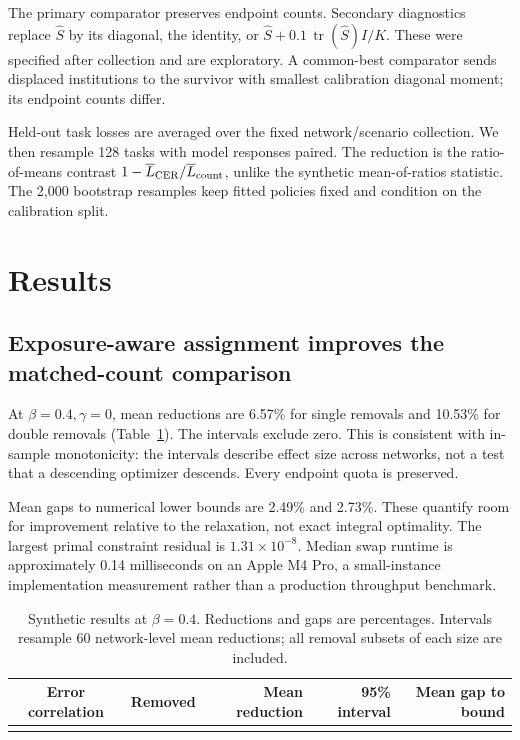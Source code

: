\documentclass[11pt]{article}
\newcommand{\tr}{\operatorname{tr}}
\begin{document}
The primary comparator preserves endpoint counts. Secondary diagnostics replace \(\widehat S\) by its diagonal, the identity, or \(\widehat S+0.1\,\tr(\widehat S)I/K\). These were specified after collection and are exploratory. A common-best comparator sends displaced institutions to the survivor with smallest calibration diagonal moment; its endpoint counts differ.

Held-out task losses are averaged over the fixed network/scenario collection. We then resample 128 tasks with model responses paired. The reduction is the ratio-of-means contrast \(1-\overline L_{\rm CER}/\overline L_{\rm count}\), unlike the synthetic mean-of-ratios statistic. The 2,000 bootstrap resamples keep fitted policies fixed and condition on the calibration split.

\section{Results}
\subsection{Exposure-aware assignment improves the matched-count comparison}
At \(\beta=0.4,\gamma=0\), mean reductions are 6.57\% for single removals and 10.53\% for double removals (Table~\ref{tab:synthetic}). The intervals exclude zero. This is consistent with in-sample monotonicity: the intervals describe effect size across networks, not a test that a descending optimizer descends. Every endpoint quota is preserved.

Mean gaps to numerical lower bounds are 2.49\% and 2.73\%. These quantify room for improvement relative to the relaxation, not exact integral optimality. The largest primal constraint residual is \(1.31\times10^{-8}\). Median swap runtime is approximately 0.14 milliseconds on an Apple M4 Pro, a small-instance implementation measurement rather than a production throughput benchmark.

\begin{table}[t]
\centering\small
\caption{Synthetic results at \(\beta=0.4\). Reductions and gaps are percentages. Intervals resample 60 network-level mean reductions; all removal subsets of each size are included.}
\label{tab:synthetic}
\begin{tabular}{ccrrr}
\toprule
Error correlation & Removed & Mean reduction & 95\% interval & Mean gap to bound\\
\midrule
{}{synthetic-table.tex}
\bottomrule
\end{tabular}
\end{table}
\end{document}

